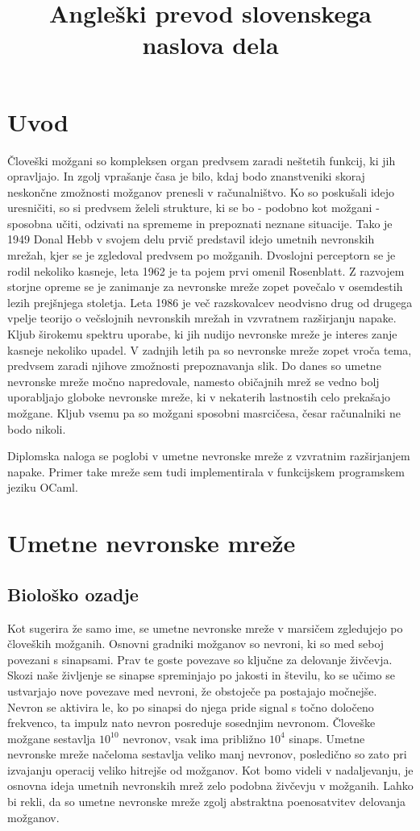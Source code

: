 \documentclass[mat1]{fmfdelo}
\title{Angleški prevod slovenskega naslova dela}
\begin{document}
%
\section{Uvod}
%
Človeški možgani so kompleksen organ predvsem zaradi neštetih funkcij, ki jih opravljajo. In zgolj vprašanje časa je bilo, kdaj bodo znanstveniki skoraj neskončne zmožnosti možganov prenesli v računalništvo. Ko so poskušali idejo uresničiti, so si predvsem želeli strukture, ki se bo - podobno kot možgani - sposobna učiti, odzivati na sprememe in prepoznati neznane situacije. Tako je 1949 Donal Hebb v svojem delu prvič predstavil idejo umetnih nevronskih mrežah, kjer se je zgledoval predvsem po možganih. Dvoslojni perceptorn se je rodil nekoliko kasneje, leta 1962 je ta pojem prvi omenil Rosenblatt. Z razvojem storjne opreme se je zanimanje za nevronske mreže zopet povečalo v osemdestih lezih prejšnjega stoletja. Leta 1986 je več razskovalcev neodvisno drug od drugega vpelje teorijo o večslojnih nevronskih mrežah in vzvratnem razširjanju napake. Kljub širokemu spektru uporabe, ki jih nudijo nevronske mreže je interes zanje kasneje nekoliko upadel. V zadnjih letih pa so nevronske mreže zopet vroča tema, predvsem zaradi njihove zmožnosti prepoznavanja slik. Do danes so umetne nevronske mreže močno napredovale, namesto običajnih mrež se vedno bolj uporabljajo globoke nevronske mreže, ki v nekaterih lastnostih celo prekašajo možgane. Kljub vsemu pa so možgani sposobni masrcičesa, česar računalniki ne bodo nikoli.

Diplomska naloga se poglobi v umetne nevronske mreže z vzvratnim razširjanjem napake. Primer take mreže sem tudi implementirala v funkcijskem programskem jeziku OCaml. 
%
\section{Umetne nevronske mreže}
%
%
\subsection{Biološko ozadje}
Kot sugerira že samo ime, se umetne nevronske mreže v marsičem zgledujejo po človeških možganih. Osnovni gradniki možganov so nevroni, ki so med seboj povezani s sinapsami. Prav te goste povezave so ključne za delovanje živčevja. Skozi naše življenje se sinapse spreminjajo po jakosti in številu, ko se učimo se ustvarjajo nove povezave med nevroni, že obstoječe pa postajajo močnejše. Nevron se aktivira le,  ko po sinapsi do njega pride signal s točno določeno frekvenco, ta impulz nato nevron posreduje sosednjim nevronom. Človeške možgane sestavlja $10^{10}$ nevronov, vsak  ima približno $10^4$ sinaps. Umetne nevronske mreže načeloma sestavlja veliko manj nevronov, posledično so zato pri izvajanju operacij veliko hitrejše od možganov. Kot bomo videli v nadaljevanju, je osnovna ideja umetnih nevronskih mrež zelo podobna živčevju v možganih. Lahko bi rekli, da so umetne nevronske mreže zgolj abstraktna poenosatvitev delovanja možganov. 
%
\end{document}
